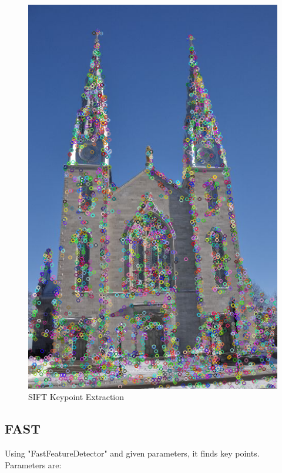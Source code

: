 \documentclass{article}
\begin{document}
\begin{figure}[H]
\begin{center}
\includegraphics[scale=0.3]{toolboxFeature.png}
\caption{SIFT Keypoint Extraction}
\end{center}
\end{figure}	   

	\subsection{FAST}
	Using "FastFeatureDetector" and given parameters, it finds key points. Parameters are:
\end{document}
